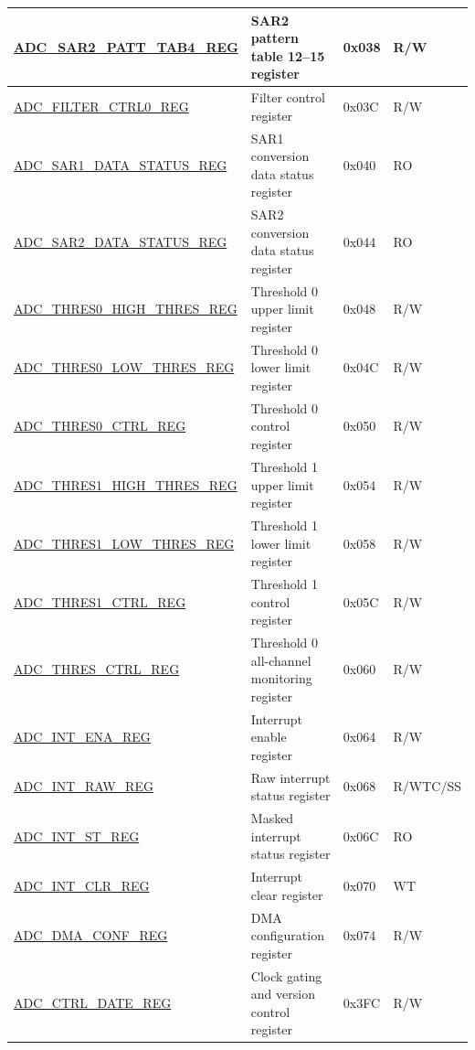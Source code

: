 \begin{longtable}{ | p{} | p{} | p{} | p{} | }
\hyperref[regdesc:ADCSAR2PATTTAB4REG]{ADC\_SAR2\_PATT\_TAB4\_REG} & SAR2 pattern table 12--15 register & 0x038 & R/W \\\hline
\hyperref[regdesc:ADCFILTERCTRL0REG]{ADC\_FILTER\_CTRL0\_REG} & Filter control register & 0x03C & R/W \\\hline
\hyperref[regdesc:ADCSAR1DATASTATUSREG]{ADC\_SAR1\_DATA\_STATUS\_REG} & SAR1 conversion data status register & 0x040 & RO \\\hline
\hyperref[regdesc:ADCSAR2DATASTATUSREG]{ADC\_SAR2\_DATA\_STATUS\_REG} & SAR2 conversion data status register & 0x044 & RO \\\hline
\hyperref[regdesc:ADCTHRES0HIGHTHRESREG]{ADC\_THRES0\_HIGH\_THRES\_REG} & Threshold 0 upper limit register & 0x048 & R/W \\\hline
\hyperref[regdesc:ADCTHRES0LOWTHRESREG]{ADC\_THRES0\_LOW\_THRES\_REG} & Threshold 0 lower limit register & 0x04C & R/W \\\hline
\hyperref[regdesc:ADCTHRES0CTRLREG]{ADC\_THRES0\_CTRL\_REG} & Threshold 0 control register & 0x050 & R/W \\\hline
\hyperref[regdesc:ADCTHRES1HIGHTHRESREG]{ADC\_THRES1\_HIGH\_THRES\_REG} & Threshold 1 upper limit register & 0x054 & R/W \\\hline
\hyperref[regdesc:ADCTHRES1LOWTHRESREG]{ADC\_THRES1\_LOW\_THRES\_REG} & Threshold 1 lower limit register & 0x058 & R/W \\\hline
\hyperref[regdesc:ADCTHRES1CTRLREG]{ADC\_THRES1\_CTRL\_REG} & Threshold 1 control register & 0x05C & R/W \\\hline
\hyperref[regdesc:ADCTHRESCTRLREG]{ADC\_THRES\_CTRL\_REG} & Threshold 0 all-channel monitoring register & 0x060 & R/W \\\hline
\hyperref[regdesc:ADCINTENAREG]{ADC\_INT\_ENA\_REG} & Interrupt enable register & 0x064 & R/W \\\hline
\hyperref[regdesc:ADCINTRAWREG]{ADC\_INT\_RAW\_REG} & Raw interrupt status register & 0x068 & R/WTC/SS \\\hline
\hyperref[regdesc:ADCINTSTREG]{ADC\_INT\_ST\_REG} & Masked interrupt status register & 0x06C & RO \\\hline
\hyperref[regdesc:ADCINTCLRREG]{ADC\_INT\_CLR\_REG} & Interrupt clear register & 0x070 & WT \\\hline
\hyperref[regdesc:ADCDMACONFREG]{ADC\_DMA\_CONF\_REG} & DMA configuration register & 0x074 & R/W \\\hline
\hyperref[regdesc:ADCCTRLDATEREG]{ADC\_CTRL\_DATE\_REG} & Clock gating and version control register & 0x3FC & R/W \\\hline

\end{longtable}
